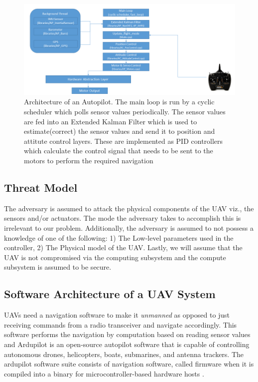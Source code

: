 \begin{figure}
    \centering
    \includegraphics[width=\textwidth]{images/ardupilot-small.png}
    \caption{Architecture of an Autopilot. The main loop is run by a cyclic scheduler which polls sensor values periodically. The sensor values are fed into an Extended Kalman Filter which is used to estimate(correct) the sensor values and send it to position and attitute control layers. These are implemented as PID controllers which calculate the control signal that needs to be sent to the motors to perform the required navigation}
    \label{fig:ardupilot}
\end{figure}

\subsection{Threat Model} The adversary is assumed to attack the physical components of the UAV viz., the sensors and/or actuators. The mode the adversary takes to accomplish this is irrelevant to our problem. Additionally, the adversary is assumed to not possess a knowledge of one of the following: 1) The Low-level parameters used in the controller, 2) The Physical model of the UAV. Lastly, we will assume that the UAV is not compromised via the computing subsystem and the compute subsystem is assumed to be secure.

\subsection{Software Architecture of a UAV System} UAVs need a navigation software to make it \textit{unmanned} as opposed to just receiving commands from a radio transceiver and navigate accordingly. This software performs the navigation by computation based on reading sensor values and  Ardupilot is an open-source autopilot software that is capable of controlling autonomous drones, helicopters, boats, submarines, and antenna trackers. The ardupilot software suite consists of navigation software, called firmware when it is compiled into a binary for microcontroller-based hardware hosts \cite{anderson2016ardupilot, wiki:xxx}.

